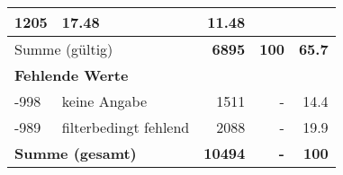 \begin{longtable}{lXrrr}
       \num{1205} &
       \num[round-mode=places,round-precision=2]{17.48} &
         \num[round-mode=places,round-precision=2]{11.48} \\
     \midrule
     \multicolumn{2}{l}{Summe (gültig)} &
       \textbf{\num{6895}} &
     \textbf{\num{100}} &
       \textbf{\num[round-mode=places,round-precision=2]{65.7}} \\
     \multicolumn{5}{l}{\textbf{Fehlende Werte}}\\
       -998 &
       keine Angabe &
         \num{1511} &
        - &
         \num[round-mode=places,round-precision=2]{14.4} \\
       -989 &
       filterbedingt fehlend &
         \num{2088} &
        - &
         \num[round-mode=places,round-precision=2]{19.9} \\
     \midrule
     \multicolumn{2}{l}{\textbf{Summe (gesamt)}} &
          \textbf{\num{10494}} &
        \textbf{-} &
        \textbf{\num{100}} \\
     \bottomrule
     \end{longtable}
     
